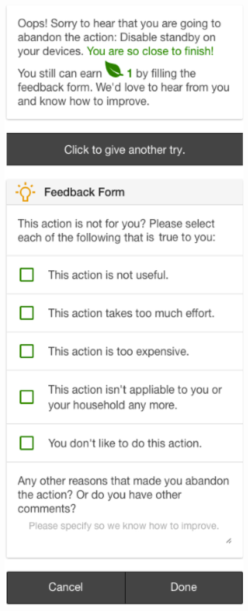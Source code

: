 \begin{figure}
\begin{center}
\begin{minipage}[t!]{0.33\linewidth}
	       \includegraphics[width=1\linewidth]{img/action_not_completed.pdf}

\end{minipage}
\end{center}
\end{figure}
